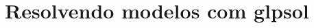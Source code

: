 \documentclass[11pt, brazil]{report}
\begin{document}
%
%
%
%
%
%
%
%
%
%
%



\chapter{Resolvendo modelos com glpsol}
\end{document}
